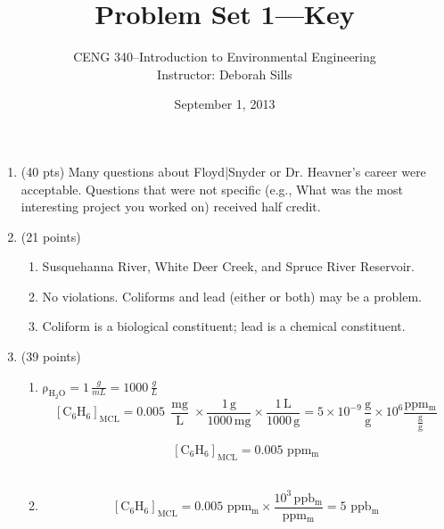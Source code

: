 \documentclass[12pt,letterpaper]{article}
\newcommand{\var}[1]{{\operatorname{#1}}}
\begin{document}
\setlength{\parindent}{0cm} 


\frenchspacing






\title {Problem Set 1---\textbf{Key}} 
\author {CENG 340--Introduction to Environmental Engineering\\
Instructor: Deborah Sills}
\date {September 1, 2013}
\maketitle

\begin{enumerate}

\item (40 pts)
Many questions about Floyd|Snyder or Dr. Heavner's career were acceptable.  Questions that were not specific (e.g., What was the most interesting project you worked on) received half credit.

\item (21 points)
\begin{enumerate}
\item Susquehanna River, White Deer Creek, and Spruce River Reservoir.
\item No violations.  Coliforms and lead (either or both) may be a problem.
\item Coliform is a biological constituent; lead is a chemical constituent.
\end{enumerate}

\item (39 points)
\begin{enumerate}
\item $\mathrm{\rho_{H_2O}} = 1\, \frac{g}{mL} = 1000\, \frac{g}{L}$
\begin{equation*}
\mathrm{[C_6H_6]_{MCL} = 0.005\, \frac{\var{mg}}{L}\times \frac{1 \, g}{1000 \, mg}\times \frac{1 \, L}{1000 \, g} = 5 \times 10^{-9}\,\frac{g}{g} \times 10^6\frac{ppm_m}{\frac{g}{g}}}
\end{equation*}

\begin{equation*}
\mathrm{[C_6H_6]_{MCL} = 0.005 \,\, ppm_m}
\end{equation*}\\

\item
\begin{equation*}
\mathrm{[C_6H_6]_{MCL} = 0.005 \,\, ppm_m \times \frac{10^3 \, ppb_m}{ppm_m} = 5\, \, ppb_m}
\end{equation*}\\


\end{enumerate}
\end{enumerate}
\end{document}
